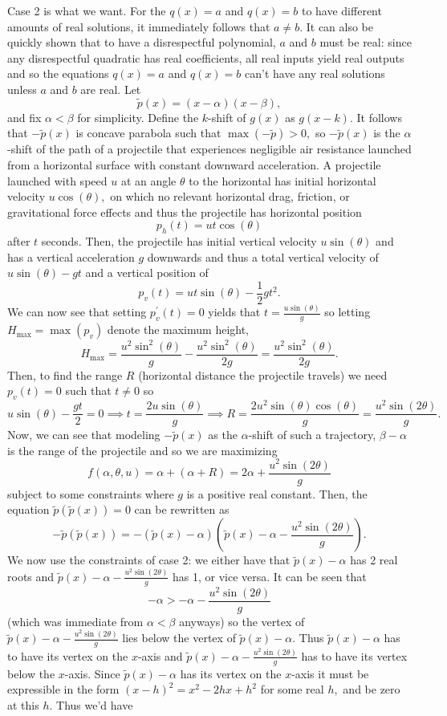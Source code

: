 \begin{enumerate}
 
Case 2 is what we want. For the $q(x)=a$ and $q(x)=b$ to have different amounts of real solutions, it immediately follows that $a\neq b.$ It can also be quickly shown that to have a disrespectful polynomial, $a$ and $b$ must be real: since any disrespectful quadratic has real coefficients, all real inputs yield real outputs and so the equations $q(x)=a$ and $q(x)=b$ can't have any real solutions unless $a$ and $b$ are real. Let 
 \[\tilde p(x)=(x-\alpha)(x-\beta),\] and fix $\alpha<\beta$ for simplicity. Define the $k$-shift of $g(x)$ as $g(x-k).$ It follows that $-\tilde p(x)$ is concave parabola such that $\max(-\tilde p)>0,$ so $-\tilde p(x)$ is the $\alpha$-shift of the path of a projectile that experiences negligible air resistance launched from a horizontal surface with constant downward acceleration. A projectile launched with speed $u$ at an angle $\theta$ to the horizontal has initial horizontal velocity $u\cos(\theta),$ on which no relevant horizontal drag, friction, or gravitational force effects and thus the projectile has horizontal position 
 \[p_h(t)=ut\cos(\theta)\] after $t$ seconds. Then, the projectile has initial vertical velocity $u\sin(\theta)$ and has a vertical acceleration $g$ downwards and thus a total vertical velocity of $u\sin(\theta)-gt$ and a vertical position of 
 \[p_v(t)=ut\sin(\theta)-\frac12gt^2.\]  We can now see that setting $p^\prime_v(t)=0$ yields that $t=\frac{u\sin(\theta)}{g}$ so letting $H_{\max}=\max(p_v)$ denote the maximum height,
 \[H_{\max}=\frac{u^2\sin^2(\theta)}{g}-\frac{u^2\sin^2(\theta)}{2g}=\frac{u^2\sin^2(\theta)}{2g}.\]Then, to find the range $R$ (horizontal distance the projectile travels) we need $p_v(t)=0$ such that $t\neq0$ so
 \[u\sin(\theta)-\frac{gt}{2}=0\implies t=\frac{2u\sin(\theta)}{g}\implies R=\frac{2u^2\sin(\theta)\cos(\theta)}{g}=\frac{u^2\sin(2\theta)}{g}.\]Now, we can see that modeling $-\tilde p(x)$ as the $\alpha$-shift of such a trajectory, $\beta-\alpha$ is the range of the projectile and so we are maximizing
 \[f(\alpha,\theta,u)=\alpha+(\alpha+R)=2\alpha+\frac{u^2\sin(2\theta)}{g}\]subject to some constraints where $g$ is a positive real constant. Then, the equation $\tilde p(\tilde p(x))=0$ can be rewritten as
 \[-\tilde p(\tilde p(x))=-(\tilde p(x)-\alpha)\left(\tilde p(x)-\alpha-\frac{u^2\sin(2\theta)}{g}\right).\]We now use the constraints of case 2: we either have that $\tilde p(x)-\alpha$ has 2 real roots and $\tilde p(x)-\alpha-\frac{u^2\sin(2\theta)}{g}$ has 1, or vice versa. It can be seen that
 \[-\alpha >-\alpha -\frac{u^2\sin(2\theta)}{g}\](which was immediate from $\alpha<\beta$ anyways) so the vertex of $\tilde p(x)-\alpha-\frac{u^2\sin(2\theta)}{g}$ lies below the vertex of $\tilde p(x)-\alpha.$ Thus $\tilde p(x)-\alpha$ has to have its vertex on the $x$-axis and $\tilde p(x)-\alpha -\frac{u^2\sin(2\theta)}{g}$ has to have its vertex below the $x$-axis. Since $\tilde p(x)-\alpha$ has its vertex on the $x$-axis it must be expressible in the form $(x-h)^2=x^2-2hx+h^2$ for some real $h,$ and be zero at this $h.$ Thus we'd have

\end{enumerate}
